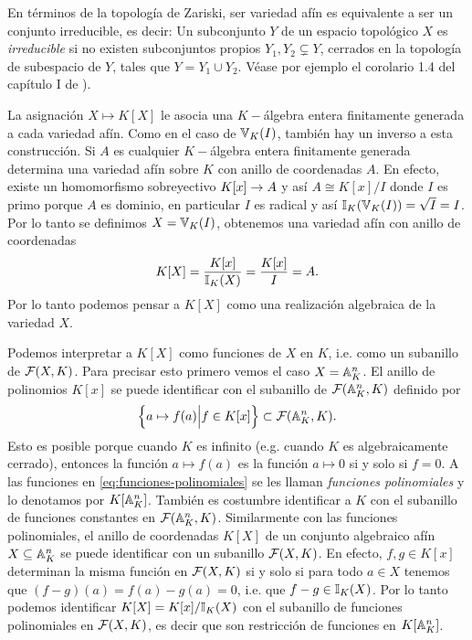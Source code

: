 \begin{nota}
	 En términos de la topología de Zariski, ser variedad afín es equivalente a ser un conjunto irreducible, es decir: Un subconjunto $Y$ de un espacio topológico $X$ es \emph{irreducible} si no existen subconjuntos propios $Y_1,Y_2\subsetneq Y$, cerrados en la topología de subespacio de $Y$, tales que $Y=Y_1\cup Y_2$. Véase por ejemplo el corolario 1.4 del capítulo I de \cite{HartshorneAG}).
\end{nota}

La asignación $X\mapsto K[X]$ le asocia una $K-$álgebra entera finitamente generada a cada variedad afín. Como en el caso de $\mathbb{V}_K(I)$, también hay un inverso a esta construcción. Si $A$ es cualquier $K-$álgebra entera finitamente generada determina una variedad afín sobre $K$ con anillo de coordenadas $A$. En efecto, existe un homomorfismo sobreyectivo $K[x]\rightarrow A$ y así $A\cong K[x]/I$ donde $I$ es primo porque $A$ es dominio, en particular $I$ es radical y así $\mathbb{I}_K(\mathbb{V}_K(I))=\sqrt{I}=I$. Por lo tanto se definimos $X=\mathbb{V}_K(I)$, obtenemos una variedad afín con anillo de coordenadas
\[
	K[X]=\frac{K[x]}{\mathbb{I}_K(X)}=\frac{K[x]}{I}=A.
\]
Por lo tanto podemos pensar a $K[X]$ como una realización algebraica de la variedad $X$.

Podemos interpretar a $K[X]$ como funciones de $X$ en $K$, i.e. como un subanillo de $\mathcal{F}(X,K)$. Para precisar esto primero vemos el caso $X=\mathbb{A}^n_K$. El anillo de polinomios $K[x]$ se puede identificar con el subanillo de $\mathcal{F}(\mathbb{A}^n_K,K)$ definido por
\begin{equation}\label{eq:funciones-polinomiales}
	\Big\{a\mapsto f(a)\Big| f\in K[x]\Big\}\subset\mathcal{F}(\mathbb{A}^n_K,K).
\end{equation}
Esto es posible porque cuando $K$ es infinito (e.g. cuando $K$ es algebraicamente cerrado), entonces la función $a\mapsto f(a)$ es la función $a\mapsto0$ si y solo si $f=0$. A las funciones en \eqref{eq:funciones-polinomiales} se les llaman \emph{funciones polinomiales} y lo denotamos por $K[\mathbb{A}^n_K]$. También es costumbre identificar a $K$ con el subanillo de funciones constantes en $\mathcal{F}(\mathbb{A}^n_K,K)$. Similarmente con las funciones polinomiales, el anillo de coordenadas $K[X]$ de un conjunto algebraico afín $X\subseteq\mathbb{A}^n_K$ se puede identificar con un subanillo $\mathcal{F}(X,K)$. En efecto, $f,g\in K[x]$ determinan la misma función en $\mathcal{F}(X,K)$ si y solo si para todo $a\in X$ tenemos que $(f-g)(a)=f(a)-g(a)=0$, i.e. que $f-g\in\mathbb{I}_K(X)$. Por lo tanto podemos identificar $K[X]=K[x]/\mathbb{I}_K(X)$ con el subanillo de funciones polinomiales en $\mathcal{F}(X,K)$, es decir que son restricción de funciones en $K[\mathbb{A}^n_K]$.

